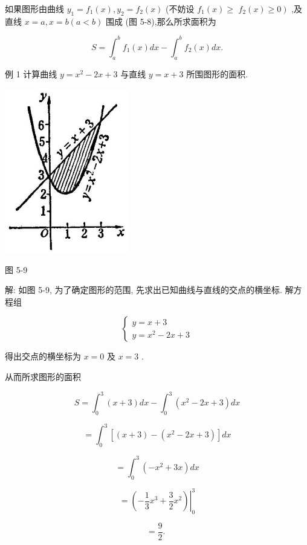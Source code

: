 \documentclass[10pt]{article}
\begin{document}
如果图形由曲线 \({y}_{1} = {f}_{1}\left( x\right) ,{y}_{2} = {f}_{2}\left( x\right)\) (不妨设 \({f}_{1}\left( x\right) \geq\) \(\left. {{f}_{2}\left( x\right) \geq 0}\right)\) ,及直线 \(x = a,x = b\left( {a < b}\right)\) 围成 (图 5-8),那么所求面积为

\[
S = {\int }_{a}^{b}{f}_{1}\left( x\right) {dx} - {\int }_{a}^{b}{f}_{2}\left( x\right) {dx}.
\]

例 1 计算曲线 \(y = {x}^{2} - {2x} + 3\) 与直线 \(y = x + 3\) 所围图形的面积.

\begin{center}
\includegraphics[max width=0.4\textwidth]{images/01912c18-5c3f-733d-b775-749ba9897a9d_232_503568.jpg}
\end{center}

图 5-9

解: 如图 5-9, 为了确定图形的范围, 先求出已知曲线与直线的交点的横坐标. 解方程组

\[
\left\{ \begin{array}{l} y = x + 3 \\ y = {x}^{2} - {2x} + 3 \end{array}\right.
\]

得出交点的横坐标为 \(x = 0\) 及 \(x = 3\) .

从而所求图形的面积

\[
S = {\int }_{0}^{3}\left( {x + 3}\right) {dx} - {\int }_{0}^{3}\left( {{x}^{2} - {2x} + 3}\right) {dx}
\]

\[
= {\int }_{0}^{3}\left\lbrack {\left( {x + 3}\right) - \left( {{x}^{2} - {2x} + 3}\right) }\right\rbrack {dx}
\]

\[
= {\int }_{0}^{3}\left( {-{x}^{2} + {3x}}\right) {dx}
\]

\[
= {\left. \left( -\frac{1}{3}{x}^{3} + \frac{3}{2}{x}^{2}\right) \right| }_{0}^{3}
\]

\[
= \frac{9}{2}\text{. }
\]
\end{document}
